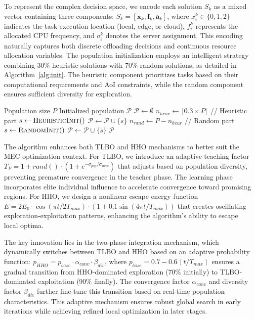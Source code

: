 \documentclass[conference]{IEEEtran}
\begin{document}
To represent the complex decision space, we encode each solution $S_k$ as a mixed vector containing three components: $S_k = [\mathbf{x}_k, \mathbf{f}_k, \mathbf{a}_k]$, where $x_i^k \in \{0, 1, 2\}$ indicates the task execution location (local, edge, or cloud), $f_i^k$ represents the allocated CPU frequency, and $a_i^k$ denotes the server assignment. This encoding naturally captures both discrete offloading decisions and continuous resource allocation variables. The population initialization employs an intelligent strategy combining 30\% heuristic solutions with 70\% random solutions, as detailed in Algorithm~\ref{alg:init}. The heuristic component prioritizes tasks based on their computational requirements and AoI constraints, while the random component ensures sufficient diversity for exploration.

\begin{algorithm}[!t]
  \small
  \caption{Intelligent Initialization Strategy}
  \label{alg:init}
  \begin{algorithmic}[1]
    \REQUIRE Population size $P$
    \ENSURE Initialized population $\mathcal{P}$
    \STATE $\mathcal{P} \leftarrow \emptyset$
    \STATE $n_{heur} \leftarrow \lfloor 0.3 \times P \rfloor$ // Heuristic part
        \STATE $s \leftarrow \textsc{HeuristicInit}()$
        \STATE $\mathcal{P} \leftarrow \mathcal{P} \cup \{s\}$
    \ENDFOR
    \STATE $n_{rand} \leftarrow P - n_{heur}$ // Random part
        \STATE $s \leftarrow \textsc{RandomInit}()$
        \STATE $\mathcal{P} \leftarrow \mathcal{P} \cup \{s\}$
    \ENDFOR
    \RETURN $\mathcal{P}$
  \end{algorithmic}
\end{algorithm}

The algorithm enhances both TLBO and HHO mechanisms to better suit the MEC optimization context. For TLBO, we introduce an adaptive teaching factor $T_F = 1 + rand() \cdot (1 + e^{-\sigma_{pop}/\sigma_{max}})$ that adjusts based on population diversity, preventing premature convergence in the teacher phase. The learning phase incorporates elite individual influence to accelerate convergence toward promising regions. For HHO, we design a nonlinear escape energy function $E = 2E_0 \cdot \cos(\pi t/2T_{max}) \cdot (1 + 0.1 \sin(4\pi t/T_{max}))$ that creates oscillating exploration-exploitation patterns, enhancing the algorithm's ability to escape local optima.

The key innovation lies in the two-phase integration mechanism, which dynamically switches between TLBO and HHO based on an adaptive probability function: $p_{HHO} = p_{base} \cdot \alpha_{conv} \cdot \beta_{div}$, where $p_{base} = 0.7 - 0.6(t/T_{max})$ ensures a gradual transition from HHO-dominated exploration (70\% initially) to TLBO-dominated exploitation (90\% finally). The convergence factor $\alpha_{conv}$ and diversity factor $\beta_{div}$ further fine-tune this transition based on real-time population characteristics. This adaptive mechanism ensures robust global search in early iterations while achieving refined local optimization in later stages.
\end{document}
